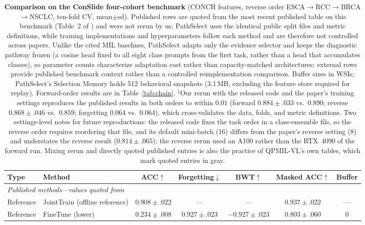 \documentclass{article}
\begin{document}
\begin{table}[t]
\centering\footnotesize
\caption{\textbf{Comparison on the ConSlide four-cohort benchmark} \cite{huang2023conslide} (CONCH features, reverse order ESCA$\rightarrow$RCC$\rightarrow$BRCA$\rightarrow$NSCLC, ten-fold CV, mean$\pm$sd). Published rows are quoted from the most recent published table on this benchmark (Table~2 of \cite{gou2025qpmil}) and were not rerun by us; PathSelect uses the identical public split files and metric definitions, while training implementations and hyperparameters follow each method and are therefore not controlled across papers. Unlike the cited MIL baselines, PathSelect adapts only the evidence selector and keeps the diagnostic pathway frozen (a cosine head fixed to all eight class prompts from the first task, rather than a head that accumulates classes), so parameter counts characterize adaptation cost rather than capacity-matched architectures; external rows provide published benchmark context rather than a controlled reimplementation comparison. Buffer sizes in WSIs; PathSelect's Selection Memory holds 512 behavioral snapshots (3.1\,MB, excluding the feature store required for replay). Forward-order results are in Table~\ref{tab:chain}. $^\ddagger$Our rerun with the released code and the paper's training settings reproduces the published results in both orders to within $0.01$ (forward $0.884{\pm}.033$ vs.\ $0.890$; reverse $0.868{\pm}.046$ vs.\ $0.859$; forgetting $0.064$ vs.\ $0.064$), which cross-validates the data, folds, and metric definitions. Two settings-level notes for future reproductions: the released code fixes the task order in a class-ensemble file, so the reverse order requires reordering that file, and its default mini-batch (16) differs from the paper's reverse setting (8) and understates the reverse result ($0.814{\pm}.065$); the reverse rerun used an A100 rather than the RTX~4090 of the forward run. Mixing rerun and directly quoted published entries is also the practice of QPMIL-VL's own tables, which mark quoted entries in gray.}
\label{tab:sota}
\begin{tabular}{llccccc}
\toprule
Type & Method & ACC$\uparrow$ & Forgetting$\downarrow$ & BWT$\uparrow$ & Masked ACC$\uparrow$ & Buffer \\
\midrule
\multicolumn{7}{l}{\emph{Published methods---values quoted from \cite{gou2025qpmil}}} \\
Reference & JointTrain (offline reference) & $0.908{\pm}.022$ & --- & --- & $0.937{\pm}.022$ & --- \\
Reference & FineTune (lower) & $0.234{\pm}.008$ & $0.927{\pm}.023$ & $-0.927{\pm}.023$ & $0.803{\pm}.060$ & 0 \\

\end{tabular}
\end{table}
\end{document}
